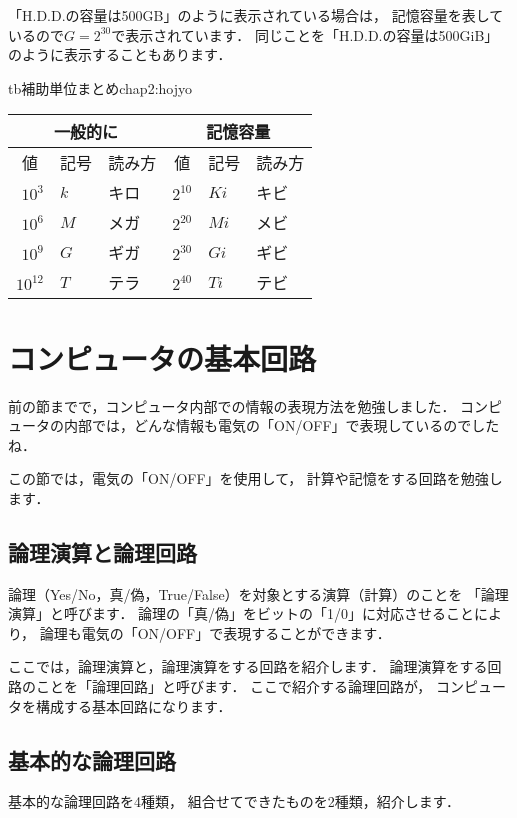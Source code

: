 「H.D.D.の容量は500GB」のように表示されている場合は，
記憶容量を表しているので$G = 2^{30}$で表示されています．
同じことを「H.D.D.の容量は500GiB」のように表示することもあります．

\begin{mytable}{tb}{補助単位まとめ}{chap2:hojyo}
{\small\begin{tabular}{r l l | r l l}\hline\hline
\multicolumn{3}{c|}{一般的に} &
\multicolumn{3}{c}{記憶容量} \\
\hline
\multicolumn{1}{c}{値} &
\multicolumn{1}{c}{記号} &
\multicolumn{1}{c|}{読み方} &
\multicolumn{1}{c}{値} &
\multicolumn{1}{c}{記号} &
\multicolumn{1}{c}{読み方} \\
\hline
$10^3$   & $k$ & キロ   & $2^{10}$ & $Ki$ & キビ \\
$10^6$   & $M$ & メガ   & $2^{20}$ & $Mi$ & メビ \\
$10^9$   & $G$ & ギガ   & $2^{30}$ & $Gi$ & ギビ \\
$10^{12}$& $T$ & テラ   & $2^{40}$ & $Ti$ & テビ \\
\end{tabular}}
\end{mytable}

\newpage
\section{コンピュータの基本回路}

前の節までで，コンピュータ内部での情報の表現方法を勉強しました．
コンピュータの内部では，どんな情報も電気の「ON/OFF」で表現しているのでしたね．

この節では，電気の「ON/OFF」を使用して，
計算や記憶をする回路を勉強します．

\subsection{論理演算と論理回路}
\label{logical}

論理（Yes/No，真/偽，True/False）を対象とする演算（計算）のことを
「論理演算」と呼びます．
論理の「真/偽」をビットの「1/0」に対応させることにより，
論理も電気の「ON/OFF」で表現することができます．

ここでは，論理演算と，論理演算をする回路を紹介します．
論理演算をする回路のことを「論理回路」と呼びます．
ここで紹介する論理回路が，
コンピュータを構成する基本回路になります．

\subsection{基本的な論理回路}
基本的な論理回路を4種類，
組合せてできたものを2種類，紹介します．


